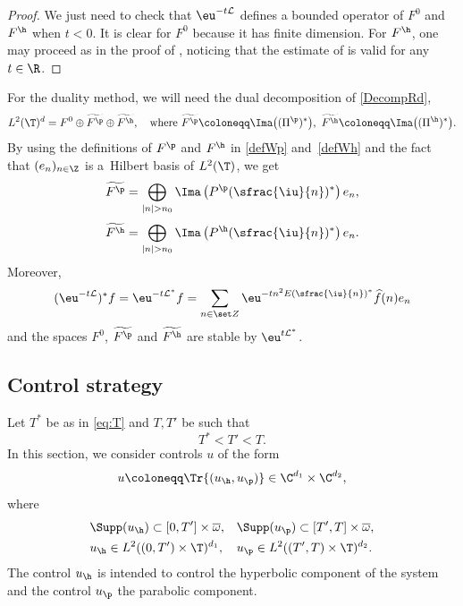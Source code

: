 \begin{proof}
We just need to check that $\eu^{-t\mathcal{L}}$ defines a bounded operator of $F^0$ and $F^\h$ when $t<0$. It is clear for $F^0$ because it has finite dimension. For $F^\h$, one may proceed as in the proof of , noticing that the estimate of  is valid for any $t\in\R$.
\end{proof}

For the duality method, we will need the dual decomposition of \eqref{DecompRd}, \ie
\begin{equation}
\label{duadecomp}
L^2(\T)^{d} = F^0 \oplus \widetilde{F^\p} \oplus \widetilde{F^\h},\quad
\text{where}\ \widetilde{F^\p} \coloneqq \Ima\big((\Pi^{\p})^{*}\big),\ \widetilde{F^\h} \coloneqq \Ima \bigl((\Pi^{\h})^{*} \bigr).
\end{equation}
By using the definitions of $F^\p$ and $F^\h$ in \eqref{defWp} and~\eqref{defWh} and the fact that $(e_n)_{n \in \Z}$ is a~Hilbert basis of $L^2(\T)$, we get
\begin{equation}
\label{defWptilde}
\widetilde{F^{\p}} =\bigoplus\limits_{|n| > n_0} \Ima\left(P^\p(\sfrac{\iu}{n})^\ast\right) e_n,
\end{equation}
\begin{equation}
\label{defWhtilde}
\widetilde{F^{\h}} =\bigoplus\limits_{|n| > n_0} \Ima\left(P^\h(\sfrac{\iu}{n})^\ast\right) e_n.
\end{equation}
Moreover,
\begin{equation}\label{eq:adj_semigroup}
(\eu^{-t\mathcal L})^\ast f = \eu^{-t\mathcal L^\ast} f= \sum_{n\in\set Z} \eu^{-tn^2 E\left(\sfrac{\iu}{n}\right)^\ast} \widehat{f}(n) e_n
\end{equation}
and the spaces $F^0$, $\widetilde{F^\p}$ and $\widetilde{F^\h}$ are stable by $\eu^{t\mathcal L^\ast}$.

\subsection{Control strategy} \label{subsec:CS}

Let $T^{*}$ be as in \eqref{eq:T} and $T, T'$ be such that
\begin{equation}
T^\ast < T' < T.
\label{defTT'}
\end{equation}
In this section, we consider controls $u$ of the form
\begin{equation}
\label{DecompH}
u \coloneqq \Tr{(u_{\h}, u_{\p})} \in \C^{d_1} \times \C^{d_2},
\end{equation}
where
\begin{align}
&\Supp(u_{\h}) \subset [0,T']\times\overline \omega,&& \Supp(u_{\p}) \subset [T',T] \times \overline \omega,
\label{suppHhHp}
\\\notag
&u_{\h} \in L^2((0,T')\times\T)^{d_1}, && u_{\p} \in L^2((T',T)\times\T)^{d_2}.
\end{align}
The control $u_{\h}$ is intended to control the hyperbolic component of the system and the control $u_{\p}$ the parabolic component.

